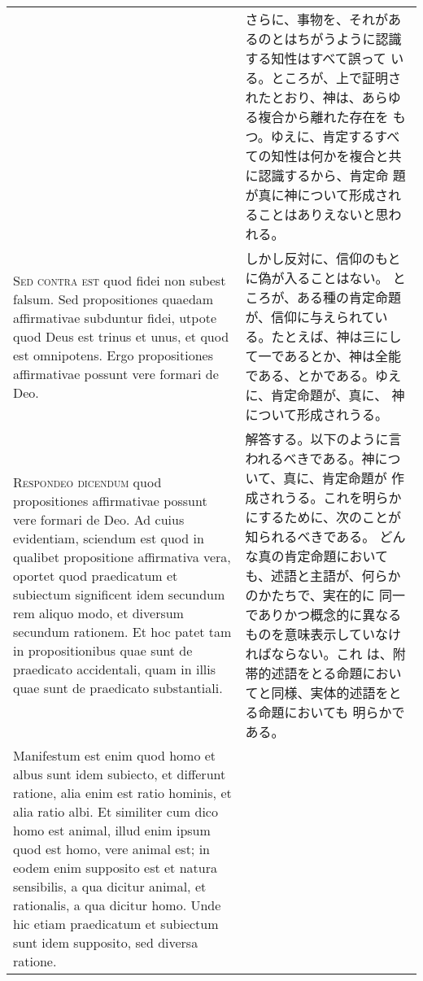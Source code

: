 \documentclass[10pt]{jsarticle} %
\begin{document}
\begin{longtable}{p{21em}p{21em}}
& 

さらに、事物を、それがあるのとはちがうように認識する知性はすべて誤って
いる。ところが、上で証明されたとおり、神は、あらゆる複合から離れた存在を
もつ。ゆえに、肯定するすべての知性は何かを複合と共に認識するから、肯定命
題が真に神について形成されることはありえないと思われる。


\\


{\scshape Sed contra est} quod fidei non subest
falsum. Sed propositiones quaedam affirmativae subduntur fidei, utpote
quod Deus est trinus et unus, et quod est omnipotens. Ergo propositiones
affirmativae possunt vere formari de Deo.


&

しかし反対に、信仰のもとに偽が入ることはない。
ところが、ある種の肯定命題が、信仰に与えられている。たとえば、神は三にし
 て一であるとか、神は全能である、とかである。ゆえに、肯定命題が、真に、
 神について形成されうる。

\\


{\scshape Respondeo dicendum} quod propositiones
affirmativae possunt vere formari de Deo. Ad cuius evidentiam, sciendum
est quod in qualibet propositione affirmativa vera, oportet quod
praedicatum et subiectum significent idem secundum rem aliquo modo, et
diversum secundum rationem. Et hoc patet tam in propositionibus quae
sunt de praedicato accidentali, quam in illis quae sunt de praedicato
substantiali. 



&

解答する。以下のように言われるべきである。神について、真に、肯定命題が
作成されうる。これを明らかにするために、次のことが知られるべきである。
どんな真の肯定命題においても、述語と主語が、何らかのかたちで、実在的に
同一でありかつ概念的に異なるものを意味表示していなければならない。これ
は、附帯的述語をとる命題においてと同様、実体的述語をとる命題においても
明らかである。

\\

Manifestum est enim quod homo et albus sunt idem subiecto,
et differunt ratione, alia enim est ratio hominis, et alia ratio
albi. Et similiter cum dico homo est animal, illud enim ipsum quod est
homo, vere animal est; in eodem enim supposito est et natura sensibilis,
a qua dicitur animal, et rationalis, a qua dicitur homo. 
Unde hic etiam
praedicatum et subiectum sunt idem supposito, sed diversa ratione.

&


\end{longtable}
\end{document}
